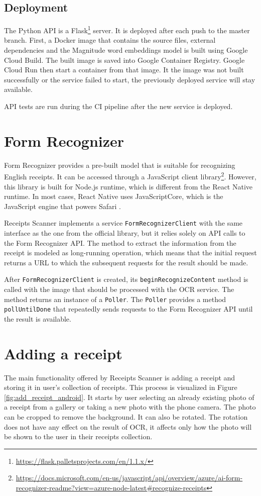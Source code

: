 \documentclass[
  digital, %
  table,   %
  oneside, %
  lof,     %
  lot,     %
]{fithesis3}
\begin{document}

\subsection{Deployment}
The Python API is a Flask\footnote{\url{https://flask.palletsprojects.com/en/1.1.x/}} server. 
It is deployed after each push to the master branch.
First, a Docker image that contains the source files, external dependencies and the Magnitude word embeddings model is built using Google Cloud Build. The built image is saved into Google Container Registry. Google Cloud Run then start a container from that image.
It the image was not built successfully or the service failed to start, the previously deployed service will stay available.

API tests are run during the CI pipeline after the new service is deployed.  

\section{Form Recognizer}
Form Recognizer provides a pre-built model that is suitable for recognizing English receipts. It can be accessed through a JavaScript client library\footnote{\url{https://docs.microsoft.com/en-us/javascript/api/overview/azure/ai-form-recognizer-readme?view=azure-node-latest\#recognize-receipts}}. However, this library is built for Node.js runtime, which is different from the React Native runtime. In most cases, React Native uses JavaScriptCore, which is the JavaScript engine that powers Safari \cite{JavaScriptRNEnvironment}.

Receipts Scanner implements a service \texttt{FormRecognizerClient} with the same interface as the one from the official library, but it relies solely on API calls to the Form Recognizer API. The method to extract the information from the receipt is modeled as long-running operation, which means that the initial request returns a URL to which the subsequent requests for the result should be made.

After \texttt{FormRecognizerClient} is created, its \texttt{beginRecognizeContent} method is called with the image that should be processed with the OCR service. The method returns an instance of a \texttt{Poller}. The \texttt{Poller} provides a method \texttt{pollUntilDone} that repeatedly sends requests to the Form Recognizer API until the result is available.

\section{Adding a receipt}
The main functionality offered by Receipts Scanner is adding a receipt and storing it in user's collection of receipts.
This process is visualized in Figure \ref{fig:add_receipt_android}.
It starts by user selecting an already existing photo of a receipt from a gallery or taking a new photo with the phone camera. The photo can be cropped to remove the background. It can also be rotated. The rotation does not have any effect on the result of OCR, it affects only how the photo will be shown to the user in their receipts collection.
\end{document}
